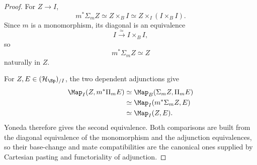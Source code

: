 \begin{proof}
For $Z\to I$,
\[
    m^*\Sigma_m Z
    \simeq
    Z\times_B I
    \simeq
    Z\times_I(I\times_BI).
\]
Since $m$ is a monomorphism, its diagonal is an equivalence
\[
    I\xrightarrow{\simeq}I\times_BI,
\]
so
\[
    m^*\Sigma_mZ\simeq Z
\]
naturally in $Z$.

For $Z,E\in(\mathcal H_{\Sp})_{/I}$, the two dependent adjunctions give
\[
\begin{aligned}
    \Map_I(Z,m^*\Pi_mE)
    &\simeq
    \Map_B(\Sigma_mZ,\Pi_mE)\\
    &\simeq
    \Map_I(m^*\Sigma_mZ,E)\\
    &\simeq
    \Map_I(Z,E).
\end{aligned}
\]
Yoneda therefore gives the second equivalence.  Both comparisons are built
from the diagonal equivalence of the monomorphism and the adjunction
equivalences, so their base-change and mate compatibilities are the canonical
ones supplied by Cartesian pasting and functoriality of adjunction.
\end{proof}

